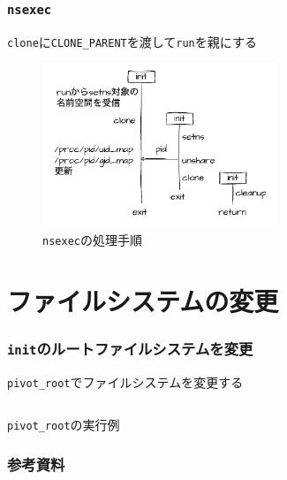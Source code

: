 \documentclass[unicode, 14pt, aspectratio=169]{beamer}
\begin{document}
\begin{frame}
  \frametitle{\texttt{nsexec}}
    \texttt{clone}に\texttt{CLONE\_PARENT}を渡して\texttt{run}を親にする
  \begin{figure}
    \centering
    \includegraphics[width=7.0cm]{images/nsenter.drawio.pdf}
    \caption{\texttt{nsexec}の処理手順}
    \label{fig:nsenter}
  \end{figure}
\end{frame}
\section{ファイルシステムの変更}
\begin{frame}[t]
  \frametitle{\texttt{init}のルートファイルシステムを変更}
  \texttt{pivot\_root}でファイルシステムを変更する
  \begin{center}
    \inputminted{sh}{code/pivot_root.sh}
    \texttt{pivot\_root}の実行例
  \end{center}
\end{frame}
\begin{frame}[allowframebreaks]
  \frametitle{参考資料}
  \printbibliography
  \nocite{*} 
\end{frame}
\end{document}
